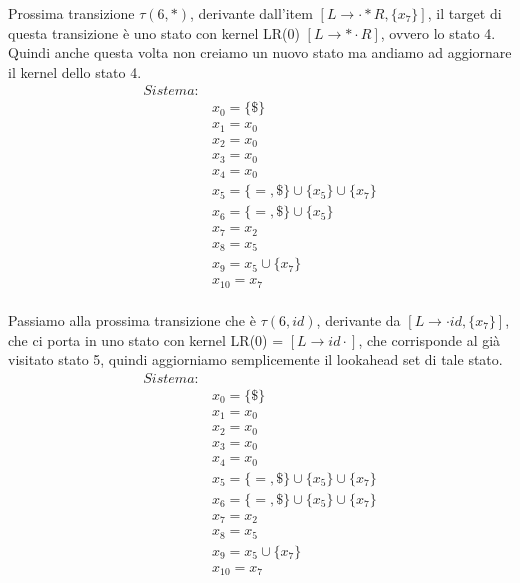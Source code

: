\documentclass[class=book, crop=false, oneside, 12pt]{standalone}
\begin{document}
Prossima transizione \(\tau(6, *)\), derivante dall'item \([L \to \cdot * R, \{x_7\}]\), il target di questa transizione è uno stato con kernel LR(0) \([L \to *\cdot R]\), ovvero lo stato 4. Quindi anche questa volta non creiamo un nuovo stato ma andiamo ad aggiornare il kernel dello stato 4.
\begin{align*}
    Sistema:& \\
            & x_0 = \{\$\} \\
            & x_1 = x_0 \\
            & x_2 = x_0 \\
            & x_3 = x_0 \\
            & x_4 = x_0 \\
            & x_5 = \{=, \$\} \cup \{x_5\} \cup \{x_7\} \\
            & x_6 = \{=, \$\} \cup \{x_5\} \\
            & x_7 = x_2 \\
            & x_8 = x_5 \\
            & x_9 = x_5 \cup \{x_7\} \\
            & x_{10} = x_7 \\
\end{align*}

Passiamo alla prossima transizione che è \(\tau(6, id)\), derivante da \([L \to \cdot id, \{x_7\}]\), che ci porta in uno stato con kernel LR(0) = \([L \to id \cdot]\), che corrisponde al già visitato stato 5, quindi aggiorniamo semplicemente il lookahead set di tale stato.
\begin{align*}
    Sistema:& \\
            & x_0 = \{\$\} \\
            & x_1 = x_0 \\
            & x_2 = x_0 \\
            & x_3 = x_0 \\
            & x_4 = x_0 \\
            & x_5 = \{=, \$\} \cup \{x_5\} \cup \{x_7\} \\
            & x_6 = \{=, \$\} \cup \{x_5\} \cup \{x_7\} \\
            & x_7 = x_2 \\
            & x_8 = x_5 \\
            & x_9 = x_5 \cup \{x_7\} \\
            & x_{10} = x_7 \\
\end{align*}
\end{document}
